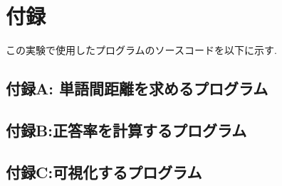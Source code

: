 \documentclass[a4paper,12pt]{article}
\begin{document}
\newpage

\appendix
\section{付録}
この実験で使用したプログラムのソースコードを以下に示す.

\subsection{付録A: 単語間距離を求めるプログラム}


\subsection{付録B:正答率を計算するプログラム}


\subsection{付録C:可視化するプログラム}

\end{document}
